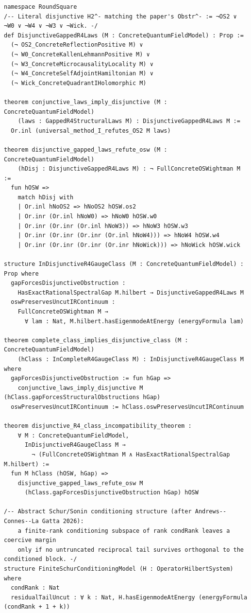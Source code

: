 \documentclass[11pt,a4paper]{article}
\theoremstyle{plain}
\theoremstyle{definition}
\theoremstyle{remark}
\renewcommand{\_}{\oldunderscore\allowbreak}
\begin{document}
\begin{lstlisting}
namespace RoundSquare
/-- Literal disjunctive H2^- matching the paper's Obstr^- := ¬OS2 ∨ ¬W0 ∨ ¬W4 ∨ ¬W3 ∨ ¬Wick. -/
def DisjunctiveGappedR4Laws (M : ConcreteQuantumFieldModel) : Prop :=
  (¬ OS2_ConcreteReflectionPositive M) ∨
  (¬ W0_ConcreteKallenLehmannPositive M) ∨
  (¬ W3_ConcreteMicrocausalityLocality M) ∨
  (¬ W4_ConcreteSelfAdjointHamiltonian M) ∨
  (¬ Wick_ConcreteQuadrantIHolomorphic M)

theorem conjunctive_laws_imply_disjunctive (M : ConcreteQuantumFieldModel)
    (laws : GappedR4StructuralLaws M) : DisjunctiveGappedR4Laws M :=
  Or.inl (universal_method_I_refutes_OS2 M laws)

theorem disjunctive_gapped_laws_refute_osw (M : ConcreteQuantumFieldModel)
    (hDisj : DisjunctiveGappedR4Laws M) : ¬ FullConcreteOSWightman M :=
  fun hOSW =>
    match hDisj with
    | Or.inl hNoOS2 => hNoOS2 hOSW.os2
    | Or.inr (Or.inl hNoW0) => hNoW0 hOSW.w0
    | Or.inr (Or.inr (Or.inl hNoW3)) => hNoW3 hOSW.w3
    | Or.inr (Or.inr (Or.inr (Or.inl hNoW4))) => hNoW4 hOSW.w4
    | Or.inr (Or.inr (Or.inr (Or.inr hNoWick))) => hNoWick hOSW.wick

structure InDisjunctiveR4GaugeClass (M : ConcreteQuantumFieldModel) : Prop where
  gapForcesDisjunctiveObstruction :
    HasExactRationalSpectralGap M.hilbert → DisjunctiveGappedR4Laws M
  oswPreservesUncutIRContinuum :
    FullConcreteOSWightman M →
      ∀ lam : Nat, M.hilbert.hasEigenmodeAtEnergy (energyFormula lam)

theorem complete_class_implies_disjunctive_class (M : ConcreteQuantumFieldModel)
    (hClass : InCompleteR4GaugeClass M) : InDisjunctiveR4GaugeClass M where
  gapForcesDisjunctiveObstruction := fun hGap =>
    conjunctive_laws_imply_disjunctive M (hClass.gapForcesStructuralObstructions hGap)
  oswPreservesUncutIRContinuum := hClass.oswPreservesUncutIRContinuum

theorem disjunctive_R4_class_incompatibility_theorem :
    ∀ M : ConcreteQuantumFieldModel,
      InDisjunctiveR4GaugeClass M →
        ¬ (FullConcreteOSWightman M ∧ HasExactRationalSpectralGap M.hilbert) :=
  fun M hClass ⟨hOSW, hGap⟩ =>
    disjunctive_gapped_laws_refute_osw M
      (hClass.gapForcesDisjunctiveObstruction hGap) hOSW

/-- Abstract Schur/Sonin conditioning structure (after Andrews--Connes--La Gatta 2026):
    a finite-rank conditioning subspace of rank condRank leaves a coercive margin
    only if no untruncated reciprocal tail survives orthogonal to the conditioned block. -/
structure FiniteSchurConditioningModel (H : OperatorHilbertSystem) where
  condRank : Nat
  residualTailUncut : ∀ k : Nat, H.hasEigenmodeAtEnergy (energyFormula (condRank + 1 + k))


\end{lstlisting}
\end{document}
